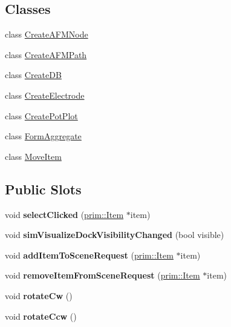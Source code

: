 \subsection*{Classes}
\begin{DoxyCompactItemize}
\item 
class \hyperlink{classgui_1_1DesignPanel_1_1CreateAFMNode}{Create\+A\+F\+M\+Node}
\item 
class \hyperlink{classgui_1_1DesignPanel_1_1CreateAFMPath}{Create\+A\+F\+M\+Path}
\item 
class \hyperlink{classgui_1_1DesignPanel_1_1CreateDB}{Create\+DB}
\item 
class \hyperlink{classgui_1_1DesignPanel_1_1CreateElectrode}{Create\+Electrode}
\item 
class \hyperlink{classgui_1_1DesignPanel_1_1CreatePotPlot}{Create\+Pot\+Plot}
\item 
class \hyperlink{classgui_1_1DesignPanel_1_1FormAggregate}{Form\+Aggregate}
\item 
class \hyperlink{classgui_1_1DesignPanel_1_1MoveItem}{Move\+Item}
\end{DoxyCompactItemize}
\subsection*{Public Slots}
\begin{DoxyCompactItemize}
\item 
void {\bfseries select\+Clicked} (\hyperlink{classprim_1_1Item}{prim\+::\+Item} $\ast$item)\hypertarget{classgui_1_1DesignPanel_a6006a4395d7d67bb0d7f30999342a202}{}\label{classgui_1_1DesignPanel_a6006a4395d7d67bb0d7f30999342a202}

\item 
void {\bfseries sim\+Visualize\+Dock\+Visibility\+Changed} (bool visible)\hypertarget{classgui_1_1DesignPanel_ae0caa279a3ed52c4718a7039fb409c4e}{}\label{classgui_1_1DesignPanel_ae0caa279a3ed52c4718a7039fb409c4e}

\item 
void {\bfseries add\+Item\+To\+Scene\+Request} (\hyperlink{classprim_1_1Item}{prim\+::\+Item} $\ast$item)\hypertarget{classgui_1_1DesignPanel_ad69776e129c0515a72b143059472fc5f}{}\label{classgui_1_1DesignPanel_ad69776e129c0515a72b143059472fc5f}

\item 
void {\bfseries remove\+Item\+From\+Scene\+Request} (\hyperlink{classprim_1_1Item}{prim\+::\+Item} $\ast$item)\hypertarget{classgui_1_1DesignPanel_a7fd43c5342808669d9236c71e9dba741}{}\label{classgui_1_1DesignPanel_a7fd43c5342808669d9236c71e9dba741}

\item 
void {\bfseries rotate\+Cw} ()\hypertarget{classgui_1_1DesignPanel_a64662997f9df22418da01295c1f509a4}{}\label{classgui_1_1DesignPanel_a64662997f9df22418da01295c1f509a4}

\item 
void {\bfseries rotate\+Ccw} ()\hypertarget{classgui_1_1DesignPanel_a46dd4d20ad0b3ffeb42a3066e17ede81}{}\label{classgui_1_1DesignPanel_a46dd4d20ad0b3ffeb42a3066e17ede81}

\end{DoxyCompactItemize}
